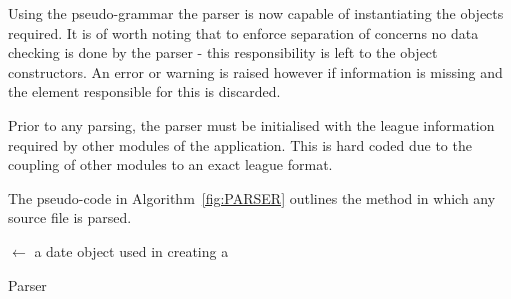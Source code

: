 Using the pseudo-grammar the parser is now capable of instantiating
the objects required. It is of worth noting that to enforce separation
of concerns no data checking is done by the parser - this
responsibility is left to the object constructors. An error or warning
is raised however if information is missing and the element
responsible for this is discarded.

Prior to any parsing, the parser must be initialised with the league
information required by other modules of the application. This is hard
coded due to the coupling of other modules to an exact league format.

The pseudo-code in Algorithm~\ref{fig:PARSER} outlines the method in
which any source file is parsed.

\IncMargin{2em}
\begin{algorithm}
  \SetAlgoLined
   
   
   

  \Date $\leftarrow$ a date object used in creating a \Match\;
    \caption{Parser}\label{fig:PARSER}
\end{algorithm}
\DecMargin{2em}


\clearpage
